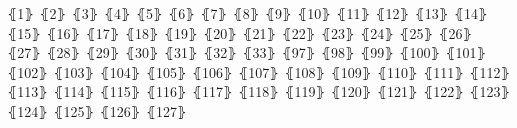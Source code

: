 ⦃1⦄
⦃2⦄
⦃3⦄
⦃4⦄
⦃5⦄
⦃6⦄
⦃7⦄
⦃8⦄
⦃9⦄
⦃10⦄
⦃11⦄
⦃12⦄
⦃13⦄
⦃14⦄
⦃15⦄
⦃16⦄
⦃17⦄
⦃18⦄
⦃19⦄
⦃20⦄
⦃21⦄
⦃22⦄
⦃23⦄
⦃24⦄
⦃25⦄
⦃26⦄
⦃27⦄
⦃28⦄
⦃29⦄
⦃30⦄
⦃31⦄
⦃32⦄
⦃33⦄
⦃97⦄
⦃98⦄
⦃99⦄
⦃100⦄
⦃101⦄
⦃102⦄
⦃103⦄
⦃104⦄
⦃105⦄
⦃106⦄
⦃107⦄
⦃108⦄
⦃109⦄
⦃110⦄
⦃111⦄
⦃112⦄
⦃113⦄
⦃114⦄
⦃115⦄
⦃116⦄
⦃117⦄
⦃118⦄
⦃119⦄
⦃120⦄
⦃121⦄
⦃122⦄
⦃123⦄
⦃124⦄
⦃125⦄
⦃126⦄
⦃127⦄
